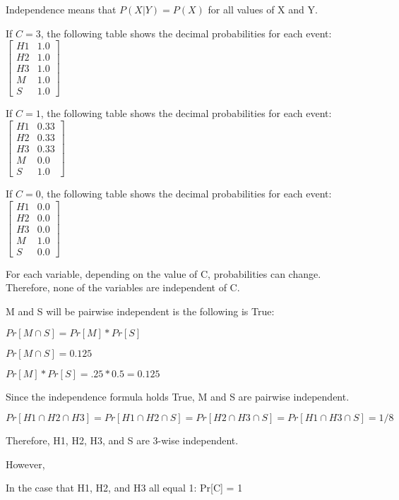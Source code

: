 \documentclass{6042}
\author{Ian Miller}
\begin{document}


Independence means that $P(X|Y) = P(X)$ for all values of X and Y.

If $C = 3$, the following table shows the decimal probabilities for each event:
$\begin{bmatrix}
    H1 & 1.0 \\
    H2 & 1.0 \\
    H3 & 1.0 \\
    M & 1.0 \\
    S & 1.0
\end{bmatrix}$

If $C = 1$, the following table shows the decimal probabilities for each event:
$\begin{bmatrix}
    H1 & 0.33 \\
    H2 & 0.33 \\
    H3 & 0.33 \\
    M & 0.0 \\
    S & 1.0
\end{bmatrix}$

If $C = 0$, the following table shows the decimal probabilities for each event:
$\begin{bmatrix}
    H1 & 0.0 \\
    H2 & 0.0 \\
    H3 & 0.0 \\
    M & 1.0 \\
    S & 0.0
\end{bmatrix}$

For each variable, depending on the value of C, probabilities can change. Therefore, none of the variables are independent of C.



M and S will be pairwise independent is the following is True:

$Pr[M \cap S] = Pr[M] * Pr[S]$

$Pr[M \cap S] = 0.125$

$Pr[M] * Pr[S] = .25 * 0.5 = 0.125$

Since the independence formula holds True, M and S are pairwise independent.


$Pr[H1 \cap H2 \cap H3] = Pr[H1 \cap H2 \cap S] = Pr[H2 \cap H3 \cap S] = Pr[H1 \cap H3 \cap S] = 1/8$

Therefore, H1, H2, H3, and S are 3-wise independent.

However, 

In the case that H1, H2, and H3 all equal 1: Pr[C] = 1
\end{document}
